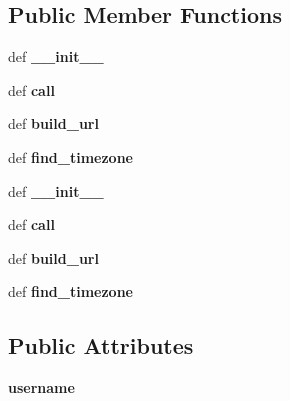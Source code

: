 \subsection*{Public Member Functions}
\begin{DoxyCompactItemize}
\item 
\hypertarget{classgeonames_1_1GeonamesClient_aa5a95dfcf1f288a80a7ef961bb2be0b4}{def {\bfseries \-\_\-\-\_\-init\-\_\-\-\_\-}}\label{classgeonames_1_1GeonamesClient_aa5a95dfcf1f288a80a7ef961bb2be0b4}

\item 
\hypertarget{classgeonames_1_1GeonamesClient_a698dd3fb0c98b20977abf6df0422e6bc}{def {\bfseries call}}\label{classgeonames_1_1GeonamesClient_a698dd3fb0c98b20977abf6df0422e6bc}

\item 
\hypertarget{classgeonames_1_1GeonamesClient_a333030fd173bf966a6f6f263d005837f}{def {\bfseries build\-\_\-url}}\label{classgeonames_1_1GeonamesClient_a333030fd173bf966a6f6f263d005837f}

\item 
\hypertarget{classgeonames_1_1GeonamesClient_a297cc7d452a59732e6c181711b6d4c4f}{def {\bfseries find\-\_\-timezone}}\label{classgeonames_1_1GeonamesClient_a297cc7d452a59732e6c181711b6d4c4f}

\item 
\hypertarget{classgeonames_1_1GeonamesClient_aa5a95dfcf1f288a80a7ef961bb2be0b4}{def {\bfseries \-\_\-\-\_\-init\-\_\-\-\_\-}}\label{classgeonames_1_1GeonamesClient_aa5a95dfcf1f288a80a7ef961bb2be0b4}

\item 
\hypertarget{classgeonames_1_1GeonamesClient_a698dd3fb0c98b20977abf6df0422e6bc}{def {\bfseries call}}\label{classgeonames_1_1GeonamesClient_a698dd3fb0c98b20977abf6df0422e6bc}

\item 
\hypertarget{classgeonames_1_1GeonamesClient_a333030fd173bf966a6f6f263d005837f}{def {\bfseries build\-\_\-url}}\label{classgeonames_1_1GeonamesClient_a333030fd173bf966a6f6f263d005837f}

\item 
\hypertarget{classgeonames_1_1GeonamesClient_a297cc7d452a59732e6c181711b6d4c4f}{def {\bfseries find\-\_\-timezone}}\label{classgeonames_1_1GeonamesClient_a297cc7d452a59732e6c181711b6d4c4f}

\end{DoxyCompactItemize}
\subsection*{Public Attributes}
\begin{DoxyCompactItemize}
\item 
\hypertarget{classgeonames_1_1GeonamesClient_afea1aced3e4db535012d12d8ff77f773}{{\bfseries username}}\label{classgeonames_1_1GeonamesClient_afea1aced3e4db535012d12d8ff77f773}

\end{DoxyCompactItemize}
